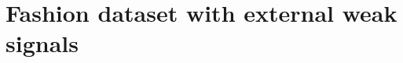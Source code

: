 \documentclass{article} %
\newcommand{\numberts}{10000}
\begin{document}
\section{Fashion dataset with external weak signals}
\label{sec:dataset}

\end{document}
